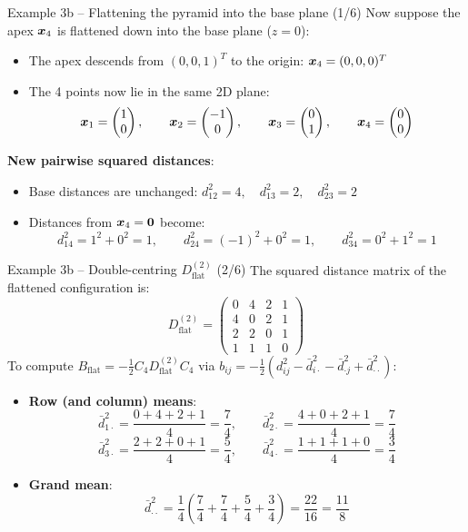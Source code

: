 \documentclass[aspectratio=169]{beamer}\usepackage[]{graphicx}\usepackage[]{xcolor}
\begin{document}
\begin{frame}{Example 3b -- Flattening the pyramid into the base plane (1/6)}
Now suppose the apex $\bm{x}_4$ is flattened down into the base plane ($z=0$):
\vfill
\begin{itemize}
\item The apex descends from $(0, 0, 1)^T$ to the origin: $\bm{x}_4 = (0, 0, 0)^T$
\item The 4 points now lie in the same 2D plane:
\[
\bm{x}_1 = \begin{pmatrix} 1 \\ 0 \end{pmatrix}, \qquad
\bm{x}_2 = \begin{pmatrix} -1 \\ 0 \end{pmatrix}, \qquad
\bm{x}_3 = \begin{pmatrix} 0 \\ 1 \end{pmatrix}, \qquad
\bm{x}_4 = \begin{pmatrix} 0 \\ 0 \end{pmatrix}
\]
\end{itemize}
\vfill
\textbf{New pairwise squared distances}:
\begin{itemize}
\item Base distances are unchanged: $d_{12}^2 = 4, \quad d_{13}^2 = 2, \quad d_{23}^2 = 2$
\item Distances from $\bx_4 = \b0$ become:
\[
d_{14}^2 = 1^2 + 0^2 = 1, \qquad d_{24}^2 = (-1)^2 + 0^2 = 1, \qquad d_{34}^2 = 0^2 + 1^2 = 1
\]
\end{itemize}
\end{frame}

\begin{frame}{Example 3b -- Double-centring $D^{(2)}_{\text{flat}}$ (2/6)}
The squared distance matrix of the flattened configuration is:
\[
D^{(2)}_{\text{flat}} = \begin{pmatrix}
0 & 4 & 2 & 1 \\
4 & 0 & 2 & 1 \\
2 & 2 & 0 & 1 \\
1 & 1 & 1 & 0
\end{pmatrix}
\]
\vfill
To compute $B_{\text{flat}} = -\frac{1}{2} C_4 D^{(2)}_{\text{flat}} C_4$ via $b_{ij} = -\frac{1}{2}(d_{ij}^2 - \bar{d}_{i\cdot}^2 - \bar{d}_{\cdot j}^2 + \bar{d}_{\cdot\cdot}^2)$:
\vfill
\begin{itemize}
\item \textbf{Row (and column) means}:
\[
\bar{d}_{1\cdot}^2 = \frac{0 + 4 + 2 + 1}{4} = \frac{7}{4}, \qquad
\bar{d}_{2\cdot}^2 = \frac{4 + 0 + 2 + 1}{4} = \frac{7}{4}
\]
\[
\bar{d}_{3\cdot}^2 = \frac{2 + 2 + 0 + 1}{4} = \frac{5}{4}, \qquad
\bar{d}_{4\cdot}^2 = \frac{1 + 1 + 1 + 0}{4} = \frac{3}{4}
\]
\item \textbf{Grand mean}:
\[
\bar{d}_{\cdot\cdot}^2 = \frac{1}{4}\left(\frac{7}{4} + \frac{7}{4} + \frac{5}{4} + \frac{3}{4}\right) = \frac{22}{16} = \frac{11}{8}
\]
\end{itemize}
\end{frame}
\end{document}
